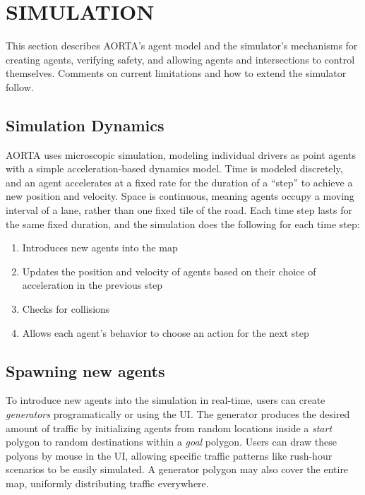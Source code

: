\documentclass[letterpaper, 10 pt, conference]{ieeeconf}  %
\begin{document}

\section{SIMULATION}
\label{sec:simulation}

This section describes AORTA's agent model and the simulator's mechanisms for
creating agents, verifying safety, and allowing agents and intersections to
control themselves. Comments on current limitations and how to extend the
simulator follow.

\subsection{Simulation Dynamics} 

AORTA uses microscopic simulation, modeling individual drivers as point agents
with a simple acceleration-based dynamics model. Time is modeled discretely,
and an agent accelerates at a fixed rate for the duration of a ``step'' to
achieve a new position and velocity. Space is continuous, meaning agents occupy
a moving interval of a lane, rather than one fixed tile of the road. Each time
step lasts for the same fixed duration, and the simulation does the following
for each time step:

\begin{enumerate}
  \item Introduces new agents into the map
  \item Updates the position and velocity of agents based on their choice of
        acceleration in the previous step
  \item Checks for collisions
  \item Allows each agent's behavior to choose an action for the next step
\end{enumerate}

\subsection{Spawning new agents}

To introduce new agents into the simulation in real-time, users can create
\emph{generators} programatically or using the UI. The generator produces the
desired amount of traffic by initializing agents from random locations inside a
\textit{start} polygon to random destinations within a \textit{goal} polygon.
Users can draw these polyons by mouse in the UI, allowing specific traffic
patterns like rush-hour scenarios to be easily simulated. A generator polygon
may also cover the entire map, uniformly distributing traffic everywhere.
\end{document}
